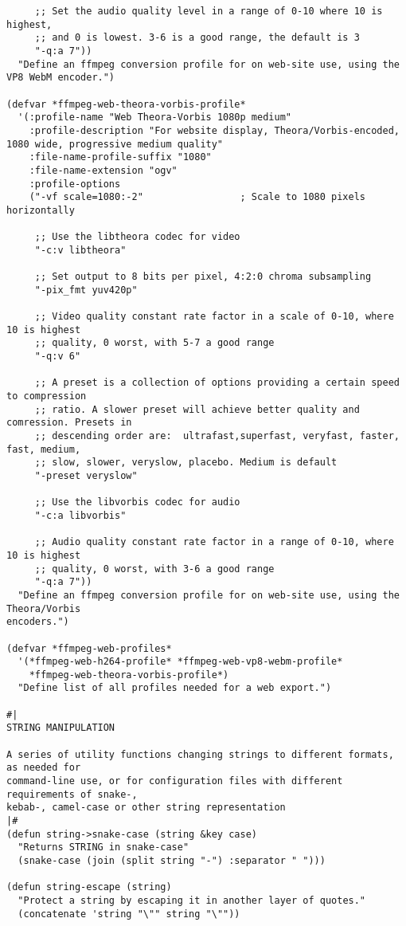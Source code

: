\documentclass{article}
\begin{document}
\begin{verbatim}
     ;; Set the audio quality level in a range of 0-10 where 10 is highest,
     ;; and 0 is lowest. 3-6 is a good range, the default is 3
     "-q:a 7"))
  "Define an ffmpeg conversion profile for on web-site use, using the VP8 WebM encoder.")

(defvar *ffmpeg-web-theora-vorbis-profile*
  '(:profile-name "Web Theora-Vorbis 1080p medium"
    :profile-description "For website display, Theora/Vorbis-encoded, 1080 wide, progressive medium quality"
    :file-name-profile-suffix "1080"
    :file-name-extension "ogv"
    :profile-options
    ("-vf scale=1080:-2"                 ; Scale to 1080 pixels horizontally

     ;; Use the libtheora codec for video
     "-c:v libtheora"
     
     ;; Set output to 8 bits per pixel, 4:2:0 chroma subsampling
     "-pix_fmt yuv420p"                  

     ;; Video quality constant rate factor in a scale of 0-10, where 10 is highest
     ;; quality, 0 worst, with 5-7 a good range
     "-q:v 6"

     ;; A preset is a collection of options providing a certain speed to compression
     ;; ratio. A slower preset will achieve better quality and comression. Presets in
     ;; descending order are:  ultrafast,superfast, veryfast, faster, fast, medium,
     ;; slow, slower, veryslow, placebo. Medium is default
     "-preset veryslow"

     ;; Use the libvorbis codec for audio
     "-c:a libvorbis"

     ;; Audio quality constant rate factor in a range of 0-10, where 10 is highest
     ;; quality, 0 worst, with 3-6 a good range
     "-q:a 7"))
  "Define an ffmpeg conversion profile for on web-site use, using the Theora/Vorbis
encoders.")

(defvar *ffmpeg-web-profiles*
  '(*ffmpeg-web-h264-profile* *ffmpeg-web-vp8-webm-profile*
    *ffmpeg-web-theora-vorbis-profile*)
  "Define list of all profiles needed for a web export.")

#|
STRING MANIPULATION

A series of utility functions changing strings to different formats, as needed for
command-line use, or for configuration files with different requirements of snake-,
kebab-, camel-case or other string representation
|#
(defun string->snake-case (string &key case)
  "Returns STRING in snake-case"
  (snake-case (join (split string "-") :separator " ")))

(defun string-escape (string)
  "Protect a string by escaping it in another layer of quotes."
  (concatenate 'string "\"" string "\""))


\end{verbatim}
\end{document}
